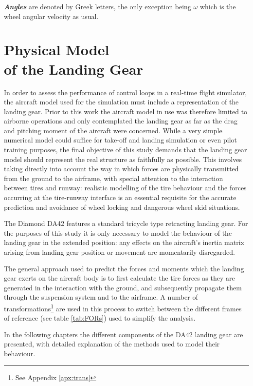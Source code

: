 \documentclass[12pt,a4paper]{report}
\begin{document}
\emph{\textbf{Angles}} are denoted by Greek letters, the only exception being $\omega$ which is the wheel angular velocity as usual.



\chapter*{Physical Model\\ of the Landing Gear}
In order to assess the performance of control loops in a real-time flight simulator, the aircraft model used for the simulation must include a representation of the landing gear. Prior to this work the aircraft model in use was therefore limited to airborne operations and only contemplated the landing gear as far as the drag and pitching moment of the aircraft were concerned.
While a very simple numerical model could suffice for take-off and landing simulation or even pilot training purposes, the final objective of this study demands that the landing gear model should represent the real structure as faithfully as possible. This involves taking directly into account the way in which forces are physically transmitted from the ground to the airframe, with special attention to the interaction between tires and runway: realistic modelling of the tire behaviour and the forces occurring at the tire-runway interface is an essential requisite for the accurate prediction and avoidance of wheel locking and dangerous wheel skid situations. 

The Diamond DA42 features a standard tricycle type retracting landing gear. For the purposes of this study it is only necessary to model the behaviour of the landing gear in the extended  position: any effects on the aircraft's inertia matrix arising from landing gear position or movement are momentarily disregarded.

The general approach used to predict the forces and moments which the landing gear exerts on the aircraft body is to first calculate the tire forces as they are generated in the interaction with the ground, and subsequently propagate them through the suspension system and to the airframe. A number of transformations\footnote{See Appendix \ref{apx:trans}} are used in this process to switch between the different frames of reference (see table \ref{tab:FORs}) used to simplify the analysis.

In the following chapters the different components of the DA42 landing gear are presented, with detailed explanation of the methods used to model their behaviour.
\end{document}
